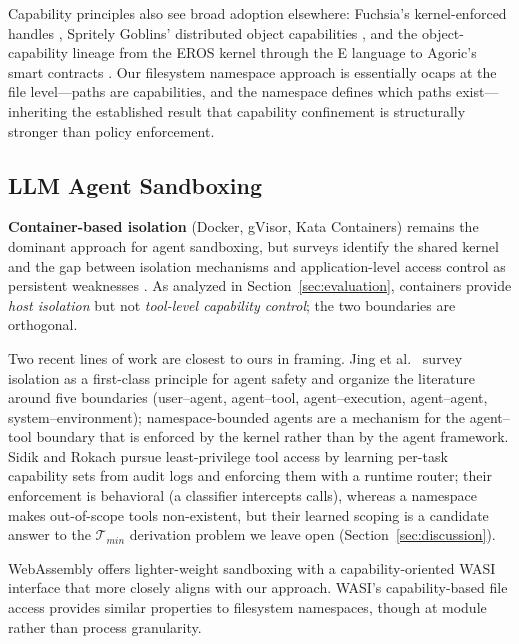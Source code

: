 \documentclass{article}
\begin{document}
Capability principles also see broad adoption elsewhere: Fuchsia's kernel-enforced handles \cite{fuchsia2025}, Spritely Goblins' distributed object capabilities \cite{spritely2025goblins}, and the object-capability lineage from the EROS kernel \cite{eros2000} through the E language \cite{elanguage2000} to Agoric's smart contracts \cite{agoric2025,miller2006capability}. Our filesystem namespace approach is essentially ocaps at the file level---paths are capabilities, and the namespace defines which paths exist---inheriting the established result that capability confinement is structurally stronger than policy enforcement.

\subsection{LLM Agent Sandboxing}

\textbf{Container-based isolation} (Docker, gVisor, Kata Containers) remains the dominant approach for agent sandboxing, but surveys identify the shared kernel and the gap between isolation mechanisms and application-level access control as persistent weaknesses \cite{sultan2019container,acm2024container}. As analyzed in Section~\ref{sec:evaluation}, containers provide \textit{host isolation} but not \textit{tool-level capability control}; the two boundaries are orthogonal.

Two recent lines of work are closest to ours in framing. Jing et al.\ \cite{jing2026isolation} survey isolation as a first-class principle for agent safety and organize the literature around five boundaries (user--agent, agent--tool, agent--execution, agent--agent, system--environment); namespace-bounded agents are a mechanism for the agent--tool boundary that is enforced by the kernel rather than by the agent framework. Sidik and Rokach \cite{sidik2026aethelgard} pursue least-privilege tool access by learning per-task capability sets from audit logs and enforcing them with a runtime router; their enforcement is behavioral (a classifier intercepts calls), whereas a namespace makes out-of-scope tools non-existent, but their learned scoping is a candidate answer to the $\mathcal{T}_{min}$ derivation problem we leave open (Section~\ref{sec:discussion}).

WebAssembly offers lighter-weight sandboxing \cite{nvidia2024wasm} with a capability-oriented WASI interface that more closely aligns with our approach. WASI's capability-based file access provides similar properties to filesystem namespaces, though at module rather than process granularity.
\end{document}
